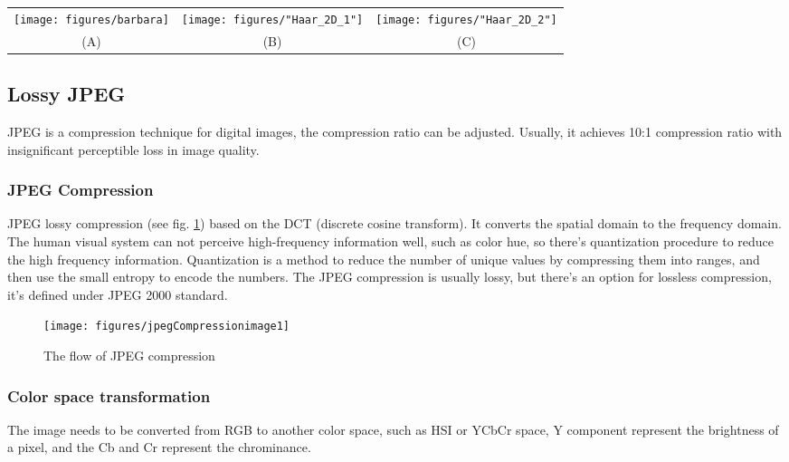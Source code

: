 \begin{figure*}[!Hbt]
  \center
  \begin{tabular}{ccc}
    \texttt{[image: figures/barbara]}&
    \texttt{[image: figures/"Haar\_2D\_1"]}&
    \texttt{[image: figures/"Haar\_2D\_2"]}\\
    (A)&(B)&(C)\\
  \end{tabular}
    \caption{2D Haar wavelet image transform}
  \label{fig:2dhaarwavelet}
\end{figure*}

\subsection{Lossy JPEG}
JPEG \cite{jpeg} is a compression technique for digital images, the compression ratio can be adjusted. Usually, it achieves 10:1 compression ratio with insignificant perceptible loss in image quality.

\subsubsection{JPEG Compression}
JPEG lossy compression (see fig. \ref{fig:jpegcompressflow}) based on the DCT (discrete cosine transform). It converts the spatial domain to the frequency domain. The human visual system can not perceive high-frequency information well, such as color hue, so there's quantization procedure to reduce the high frequency information. Quantization is a method to reduce the number of unique values by compressing them into ranges, and then use the small entropy to encode the numbers. The JPEG compression is usually lossy, but there's an option for lossless compression, it's defined under JPEG 2000 standard.


\begin{figure}[hbt]
  \center
        \texttt{[image: figures/jpegCompressionimage1]}
        \caption{The flow of JPEG compression}
  \label{fig:jpegcompressflow}
\end{figure}

\subsubsection{Color space transformation}
The image needs to be converted from RGB to another color space, such as HSI or YCbCr space, Y component represent the brightness of a pixel, and the Cb and Cr represent the chrominance. 

